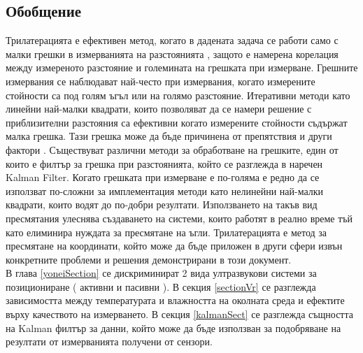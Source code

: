 \subsection{Обобщение}

Трилатерацията е ефективен метод, когато в дадената задача се работи само с малки грешки в измерванията на разстоянията \cite{trilat}, защото е намерена корелация между измереното разстояние и големината на грешката при измерване. Грешните измервания се наблюдават най-често при измервания, когато измерените стойности са под голям ъгъл или на голямо разстояние. Итеративни методи като линейни най-малки квадрати, които позволяват да се намери решение с приблизителни разстояния са ефективни когато измерените стойности съдържат малка грешка. Тази грешка може да бъде причинена от препятствия и други фактори \cite{yonei}. Съществуват различни методи за обработване на грешките, един от които е филтър за грешка при разстоянията, който се разглежда в \cite{yonei} наречен Kalman Filter. Когато грешката при измерване е по-голяма е редно да се използват по-сложни за имплементация методи като нелинейни най-малки квадрати, които водят до по-добри резултати. Използването на такъв вид пресмятания улеснява създаването на системи, които работят в реално време тъй като елиминира нуждата за пресмятане на ъгли. Трилатерацията е метод за пресмятане на координати, който може да бъде приложен в други сфери извън конкретните проблеми и решения демонстрирани в този документ. \\В глава \ref{yoneiSection} се дискриминират 2 вида ултразвукови системи за позициониране ( активни и пасивни ). В секция \ref{sectionVr} се разглежда зависимостта между температурата и влажността на околната среда и ефектите върху качеството на измерването. В секция \ref{kalmanSect} се разглежда същността на Kalman филтър за данни, който може да бъде използван за подобряване на резултати от измерванията получени от сензори.
